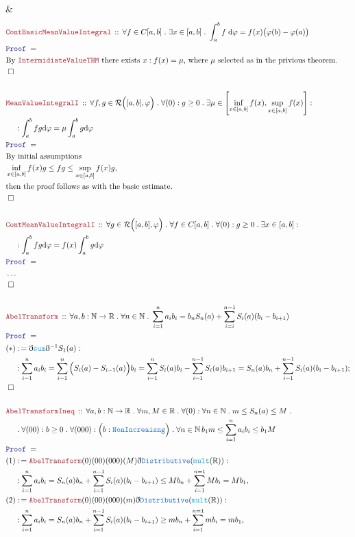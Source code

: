 \documentclass[12pt]{scrartcl}
\newcommand{\TYPE}[1]{\textcolor{NavyBlue}{\mathtt{#1}}}
\newcommand{\FUNC}[1]{\textcolor{Cerulean}{\mathtt{#1}}}
\newcommand{\LOGIC}[1]{\textcolor{Blue}{\mathtt{#1}}}
\newcommand{\THM}[1]{\textcolor{Maroon}{\mathtt{#1}}}
\renewcommand{\.}{\; . \;}
\newcommand{\de}{: \kern 0.1pc =}
\newcommand{\Theorem}[2]{& \THM{#1} \, :: \, #2 \\ & \Proof = \\ }
\newcommand{\NewLine}{\\ & \kern 1pc}
\newcommand{\Page}[1]{ \begin{align*} #1 \end{align*}   }
\newcommand{ \bd }{ \ByDef }
\newcommand{\NoProof}{ & \ldots \\ \EndProof}
\newcommand{\Reals}{\mathbb{R} }
\newcommand{\Nat}{\mathbb{N} }
\newcommand{\Say}[3]{& #1 \de #2 : #3, \\}
\newcommand{\Conclude}[3]{& #1 \de #2 : #3; \\}
\newcommand{\QED}{\; \square}
\newcommand{\EndProof}{& \QED \\}
\newcommand{\ByDef}{\eth}
\newcommand{\Proof}{\LOGIC{Proof} \; }
\begin{document}
{	\EndProof
}\Page{
	\Theorem{ContBasicMeanValueIntegral}{\forall f \in C[a,b] \. \exists  x \in [a,b] \. 
		\int^b_a f \; \mathrm{d}\varphi = f(x)\big( \varphi(b) - \varphi(a)\big)
	}
	& \text{By $\THM{IntermidiateValueTHM}$ there exists $x : f(x) = \mu$, where $\mu$
	selected as in the privious theorem. 
	}\\
	\EndProof
	\\
	\Theorem{MeanValueIntegralI}{\forall f,g \in \mathcal{R}\Big([a,b],\varphi\Big) \. 
		\forall (0) : g \ge 0 \. \exists \mu \in \left[ \inf_{x \in [a,b]} f(x),\sup_{x \in [a,b]} f(x) \right]
		: \NewLine : \int^b_a fg \mathrm{d}\varphi  = \mu \int^b_a g \mathrm{d} \varphi 
	}
	& \text{By initial assumptions} \\
	&  \inf_{x \in [a,b]} f(x)g \le fg \le \sup_{x \in [a,b]} f(x)g, \\
	& \text{then the proof follows as with the basic estimate.} \\
	\EndProof
	\\
	\Theorem{ContMeanValueIntegralI}{\forall g \in \mathcal{R}\Big([a,b],\varphi\Big) \. 
		\forall f \in C[a,b] \. 
		\forall (0) : g \ge 0 \. \exists x \in \left[ a,b  \right]
		: \NewLine : \int^b_a fg \mathrm{d}\varphi  = f(x) \int^b_a g \mathrm{d} \varphi 
	}
	\NoProof
	\\
	\Theorem{AbelTransform}{\forall a,b : \Nat \to \Reals \. \forall n \in \Nat \.
	  \sum^n_{i=1} a_ib_i = b_n S_n(a)  + \sum^{n-1}_{i=i} S_i(a)( b_{i} - b_{i+1})
	}
	\Conclude{(*)}{\bd \FUNC{sum}\bd^{-1}S_1(a)}
	{  	\NewLine :
		\sum^n_{i=1} a_ib_i =  \sum^n_{i=1} \Big(S_i(a) - S_{i-1}(a)\Big)b_i 
		= \sum^n_{i=1} S_i(a) b_i - \sum^{n-1}_{i=1} S_i(a)b_{i+1}    
		= S_n(a) b_n   + \sum^{n-1}_{i=1} S_i(a)(b_i - b_{i+1})
	}
	\EndProof
	\\
	\Theorem{AbelTransformIneq}{\forall a,b : \Nat \to \Reals \. 
		\forall m,M \in \Reals \. \forall (0)  : \forall n \in \Nat \. m \le S_n(a) \le M \. 
			\NewLine \.
		\forall (00) : b \ge 0 \. \forall (000) : \Big( b : \TYPE{NonIncreaisng} \Big) \.
		\forall n \in \Nat \, b_1m \le \sum^n_{i=1} a_ib_i \le b_1 M
		}
		\Say{(1)}{ \THM{AbelTransform}(0)(00)(000)(M)\bd \TYPE{Distributive}(\FUNC{mult}(\Reals))  }
		{ \NewLine:
			\sum^n_{i=1} a_i b_i = S_n(a)b_n + \sum^{n-1}_{i=1} S_i(a)( b_i - b_{i+1}) 
		 \le  Mb_n + \sum^{n=1}_{i=1} Mb_i  = Mb_1
		}
		\Say{(2)}{ \THM{AbelTransform}(0)(00)(000)(m)\bd \TYPE{Distributive}(\FUNC{mult}(\Reals))  }
		{ \NewLine:
			\sum^n_{i=1} a_i b_i = S_n(a)b_n + \sum^{n-1}_{i=1} S_i(a)( b_i - b_{i+1}) 
		 \ge  mb_n + \sum^{n=1}_{i=1} mb_i  = mb_1
}}
\end{document}

